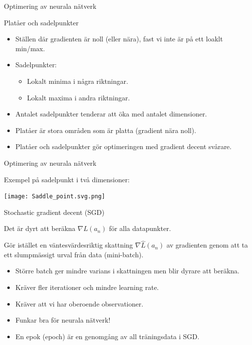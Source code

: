\documentclass[10pt,english]{beamer}
\begin{document}
\begin{frame}{Optimering av neurala nätverk}
    
    Platåer och sadelpunkter
    \begin{itemize}
        \item Ställen där gradienten är noll (eller nära), fast vi inte är på ett loaklt min/max.
        \item Sadelpunkter:
        \begin{itemize}
            \item Lokalt minima i några riktningar.
            \item Lokalt maxima i andra riktningar.
        \end{itemize}
        \item Antalet sadelpunkter tenderar att öka med antalet dimensioner.
        \item Platåer är stora områden som är platta (gradient nära noll).
        \item Platåer och sadelpunkter gör optimeringen med gradient decent svårare.
    \end{itemize}

\end{frame}

\begin{frame}{Optimering av neurala nätverk}
    
    Exempel på sadelpunkt i två dimensioner:
    
    \texttt{[image: Saddle\_point.svg.png]}

\end{frame}

\begin{frame}{Stochastic gradient decent (SGD)}

    Det är dyrt att beräkna $\nabla L(a_n)$ för alla datapunkter.

    Gör istället en väntesvärdesriktig skattning $\nabla \hat{L}(a_n)$ av gradienten genom att ta ett slumpmässigt urval från data (mini-batch).

    \begin{itemize}
        \item Större batch ger mindre varians i skattningen men blir dyrare att beräkna.
        \item Kräver fler iterationer och mindre learning rate.
        \item Kräver att vi har oberoende observationer.
        \item Funkar bra för neurala nätverk!
        \item En epok (epoch) är en genomgång av all träningsdata i SGD.
    \end{itemize}
    
\end{frame}
\end{document}
